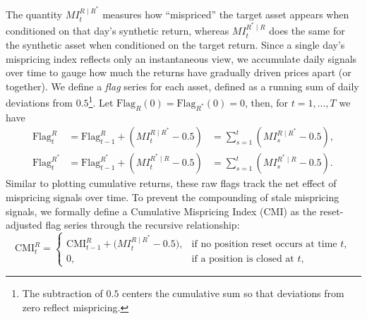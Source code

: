 The quantity $MI_t^{R \mid R^*}$ measures how ``mispriced'' the target asset appears when conditioned on that day's synthetic return, whereas $MI_t^{R^* \mid R}$ does the same for the synthetic asset when conditioned on the target return.
%
Since a single day's mispricing index reflects only an instantaneous view, we accumulate daily signals over time to gauge how much the returns have gradually driven prices apart (or together). We define a \emph{flag} series for each asset, defined as a running sum of daily deviations from $0.5$\footnote{The subtraction of $0.5$ centers the cumulative sum so that deviations from zero reflect mispricing.}. Let $\text{Flag}_{R}(0)=\text{Flag}_{R^*}(0)=0$, then, for $t=1, ..., T$ we have
$$\begin{array}{llll}
\mathrm{Flag}^{R}_{t} 
&= \mathrm{Flag}^{R}_{t-1} + (MI_t^{R \mid R^*} - 0.5)
&=\sum_{s=1}^t (MI_s^{R \mid R^*} - 0.5),
\\[0.2em]
\mathrm{Flag}^{R^*}_{t}
&= \mathrm{Flag}^{R^*}_{t-1} + (MI_t^{R^* \mid R} - 0.5)
&= \sum_{s=1}^t (MI_s^{R^* \mid R} - 0.5)
.
\end{array}$$
Similar to plotting cumulative returns, these raw flags track the net effect of mispricing signals over time. 
%
To prevent the compounding of stale mispricing signals, we formally define a Cumulative Mispricing Index (CMI) as the reset-adjusted flag series through the recursive relationship:
$$
\mathrm{CMI}^{R}_{t} =
\begin{cases}
\mathrm{CMI}^{R}_{t-1} + \bigl(MI_t^{R\mid R^*} - 0.5\bigr), & \text{if no position reset occurs at time } t,\\
0, & \text{if a position is closed at } t,
\end{cases}
$$
